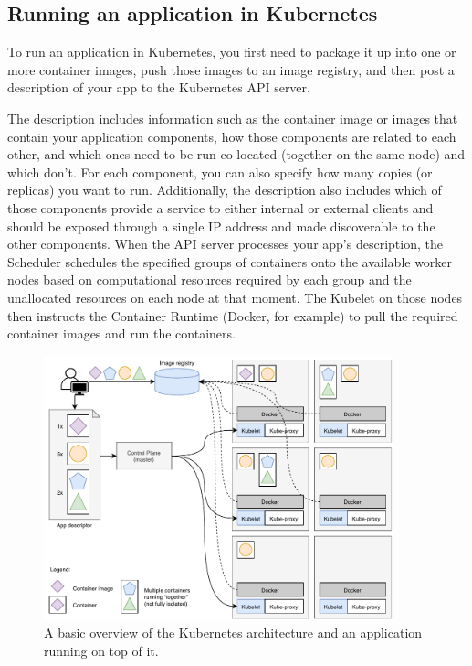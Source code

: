 \subsection{Running an application in Kubernetes}
To run an application in Kubernetes, you first need to package it up into one or more container images, push those images to an image registry, and then post a description of your app to the Kubernetes API server.

The description includes information such as the container image or images that contain your application components, how those components are related to each other, and which ones need to be run co-located (together on the same node) and which don’t. For each component, you can also specify how many copies (or replicas) you want to run. Additionally, the description also includes which of those components provide a service to either internal or external clients and should be exposed through a single IP address and made discoverable to the other components.
When the API server processes your app’s description, the Scheduler schedules the specified groups of containers onto the available worker nodes based on computational resources required by each group and the unallocated resources on each node at that moment. The Kubelet on those nodes then instructs the Container Runtime (Docker, for example) to pull the required container images and run the containers.

\begin{figure}[htbp]
	\centering
	\includegraphics[width=0.9\textwidth]{images/kubedockeroverview.pdf}
	\caption{A basic overview of the Kubernetes architecture and an application running on top of it.}
	\label{fig:kubedockeroverview}
\end{figure}

